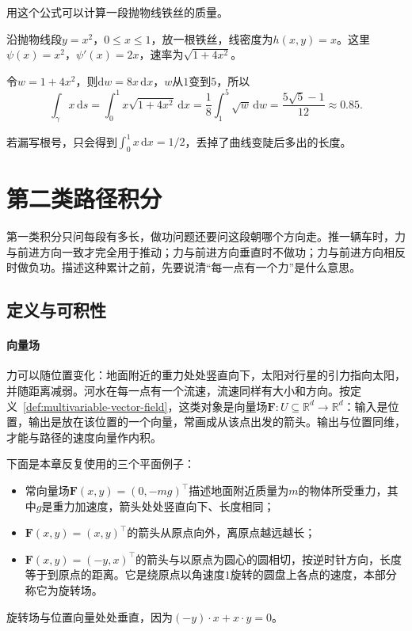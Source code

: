用这个公式可以计算一段抛物线铁丝的质量。
\begin{example}[抛物线铁丝的质量]
沿抛物线段$y=x^2$，$0\leq x\leq1$，放一根铁丝，线密度为$h(x,y)=x$。这里$\psi(x)=x^2$，$\psi'(x)=2x$，速率为$\sqrt{1+4x^2}$。

令$w=1+4x^2$，则$\mathrm dw=8x\,\mathrm dx$，$w$从$1$变到$5$，所以
\[
 \int_\gamma x\,\mathrm ds=\int_0^1x\sqrt{1+4x^2}\,\mathrm dx
 =\frac18\int_1^5\sqrt w\,\mathrm dw=\frac{5\sqrt5-1}{12}\approx0.85.
\]
\end{example}
若漏写根号，只会得到$\int_0^1x\,\mathrm dx=1/2$，丢掉了曲线变陡后多出的长度。

\section{第二类路径积分}

第一类积分只问每段有多长，做功问题还要问这段朝哪个方向走。推一辆车时，力与前进方向一致才完全用于推动；力与前进方向垂直时不做功；力与前进方向相反时做负功。描述这种累计之前，先要说清“每一点有一个力”是什么意思。

\subsection{定义与可积性}

\paragraph{向量场}

力可以随位置变化：地面附近的重力处处竖直向下，太阳对行星的引力指向太阳，并随距离减弱。河水在每一点有一个流速，流速同样有大小和方向。按定义~\ref{def:multivariable-vector-field}，这类对象是向量场$\bm F:U\subseteq\mathbb R^d\to\mathbb R^d$：输入是位置，输出是放在该位置的一个向量，常画成从该点出发的箭头。输出与位置同维，才能与路径的速度向量作内积。

下面是本章反复使用的三个平面例子：
\begin{itemize}
 \item 常向量场$\bm F(x,y)=(0,-mg)^\top$描述地面附近质量为$m$的物体所受重力，其中$g$是重力加速度，箭头处处竖直向下、长度相同；
 \item $\bm F(x,y)=(x,y)^\top$的箭头从原点向外，离原点越远越长；
 \item $\bm F(x,y)=(-y,x)^\top$的箭头与以原点为圆心的圆相切，按逆时针方向，长度等于到原点的距离。它是绕原点以角速度$1$旋转的圆盘上各点的速度，本部分称它为旋转场。
\end{itemize}
旋转场与位置向量处处垂直，因为$(-y)\cdot x+x\cdot y=0$。

